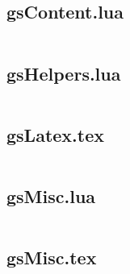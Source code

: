 \documentclass[11pt]{article}
\begin{document}
\subsection{gsContent.lua}

\inputminted{lua}{media/gsContent.lua}

\subsection{gsHelpers.lua}

\inputminted{lua}{media/gsHelpers.lua}

\subsection{gsLatex.tex}

\inputminted{latex}{media/gsLatex.tex}

\subsection{gsMisc.lua}

\inputminted{lua}{media/gsMisc.lua}

\subsection{gsMisc.tex}

\inputminted{latex}{media/gsMisc.tex}
\end{document}
